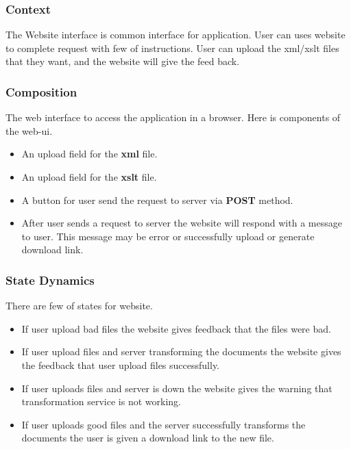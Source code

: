 \subsubsection{Context}

The Website interface is common interface for application.
User can uses website to complete request with few of instructions.
User can upload the \gls{xml}/\gls{xslt} files that they want, and the website will give the feed back.

\subsubsection{Composition}

The web interface to access the application in a browser.
Here is components of the \gls{web-ui}.

\begin{itemize}
    \item An upload field for the \textbf{\gls{xml}} file.
    \item An upload field for the \textbf{\gls{xslt}} file.
    \item A button for user send the request to server via \textbf{POST} method.
    \item {
       After user sends a request to server the website will respond with a message to user.
        This message may be error or successfully upload or generate download link.
    }
\end{itemize}

\subsubsection{State Dynamics}

There are few of states for website.

\begin{itemize}
    \item If user upload bad files the website gives feedback that the files were bad.
    \item If user upload files and server transforming the documents the website gives the feedback that user upload files successfully.
    \item If user uploads files and server is down the website gives the warning that transformation service is not working.
    \item If user uploads good files and the server successfully transforms the documents the user is given a download link to the new file.
\end{itemize}

